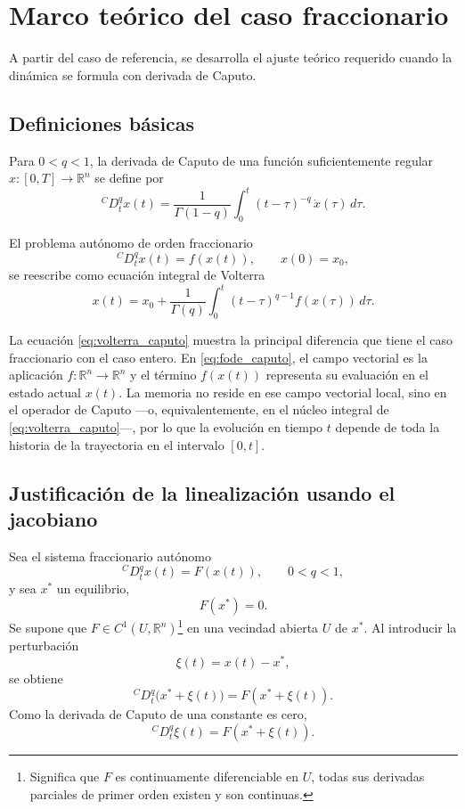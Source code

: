 \documentclass[journal]{IEEEtran}
\newcommand{\CaputoD}[1]{{}^{C}D_t^{#1}}
\newcommand{\R}{\mathbb{R}}
\begin{document}
\clearpage

\section{Marco teórico del caso fraccionario}
A partir del caso de referencia, se desarrolla el ajuste teórico requerido cuando la dinámica se formula con derivada de Caputo. 

\subsection{Definiciones básicas}

Para $0<q<1$, la derivada de Caputo de una función suficientemente regular $x:[0,T]\to\R^n$ se define por
\begin{equation}
\CaputoD{q}x(t)=\frac{1}{\Gamma(1-q)}\int_0^t (t-\tau)^{-q}\,\dot x(\tau)\,d\tau.
\label{eq:caputo_def}
\end{equation}

\noindent El problema autónomo de orden fraccionario
\begin{equation}
\CaputoD{q}x(t)=f(x(t)),\qquad x(0)=x_0,
\label{eq:fode_caputo}
\end{equation}
se reescribe como ecuación integral de Volterra
\begin{equation}
 x(t)=x_0+\frac{1}{\Gamma(q)}\int_0^t (t-\tau)^{q-1}f(x(\tau))\,d\tau.
\label{eq:volterra_caputo}
\end{equation}

\noindent La ecuación \eqref{eq:volterra_caputo} muestra la principal diferencia que tiene el caso fraccionario con el caso entero. En \eqref{eq:fode_caputo}, el campo vectorial es la aplicación $f:\R^n\to\R^n$ y el término $f(x(t))$ representa su evaluación en el estado actual $x(t)$. La memoria no reside en ese campo vectorial local, sino en el operador de Caputo ---o, equivalentemente, en el núcleo integral de \eqref{eq:volterra_caputo}---, por lo que la evolución en tiempo $t$ depende de toda la historia de la trayectoria en el intervalo $[0,t]$.

\subsection{Justificación de la linealización usando el jacobiano}

Sea el sistema fraccionario autónomo
\[
{}^{C}D_t^q x(t)=F(x(t)),\qquad 0<q<1,
\]
y sea \(x^\ast\) un equilibrio,
\[
F(x^\ast)=0.
\]
Se supone que \(F\in C^1(U,\mathbb R^n)\)\footnote{Significa que \(F\) es continuamente diferenciable en \(U\), todas sus derivadas parciales de primer orden existen y son continuas.} en una vecindad abierta \(U\) de \(x^\ast\). Al introducir la perturbación
\[
\xi(t)=x(t)-x^\ast,
\]
se obtiene
\[
{}^{C}D_t^q\big(x^\ast+\xi(t)\big)=F(x^\ast+\xi(t)).
\]
Como la derivada de Caputo de una constante es cero,
\[
{}^{C}D_t^q \xi(t)=F(x^\ast+\xi(t)).
\]
\end{document}
